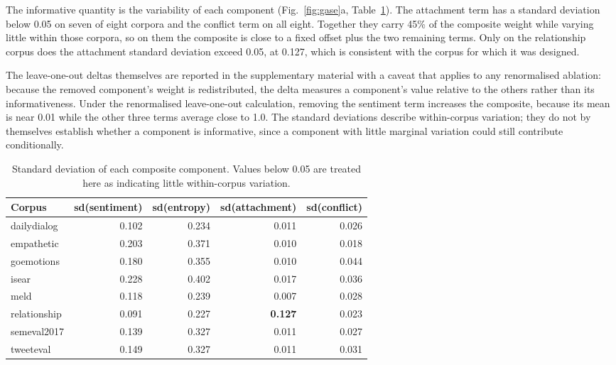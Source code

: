 \documentclass[fleqn,10pt]{wlscirep}
\providecommand{\botrule}{\bottomrule}
\begin{document}
The informative quantity is the variability of each component (Fig.~\ref{fig:gase}a, Table~\ref{tab:gase}). The attachment term has a standard deviation below 0.05 on seven of eight corpora and the conflict term on all eight. Together they carry 45\% of the composite weight while varying little within those corpora, so on them the composite is close to a fixed offset plus the two remaining terms. Only on the relationship corpus does the attachment standard deviation exceed 0.05, at 0.127, which is consistent with the corpus for which it was designed.

The leave-one-out deltas themselves are reported in the supplementary material with a caveat that applies to any renormalised ablation: because the removed component's weight is redistributed, the delta measures a component's value relative to the others rather than its informativeness. Under the renormalised leave-one-out calculation, removing the sentiment term increases the composite, because its mean is near 0.01 while the other three terms average close to 1.0. The standard deviations describe within-corpus variation; they do not by themselves establish whether a component is informative, since a component with little marginal variation could still contribute conditionally.

\begin{table}[ht]
\centering
\caption{Standard deviation of each composite component. Values below 0.05 are treated here as indicating little within-corpus variation.}
\label{tab:gase}
\begin{tabular}{lrrrr}
\toprule
Corpus & sd(sentiment) & sd(entropy) & sd(attachment) & sd(conflict) \\
\midrule
dailydialog  & 0.102 & 0.234 & 0.011 & 0.026 \\
empathetic   & 0.203 & 0.371 & 0.010 & 0.018 \\
goemotions   & 0.180 & 0.355 & 0.010 & 0.044 \\
isear        & 0.228 & 0.402 & 0.017 & 0.036 \\
meld         & 0.118 & 0.239 & 0.007 & 0.028 \\
relationship & 0.091 & 0.227 & \textbf{0.127} & 0.023 \\
semeval2017  & 0.139 & 0.327 & 0.011 & 0.027 \\
tweeteval    & 0.149 & 0.327 & 0.011 & 0.031 \\
\botrule
\end{tabular}
\end{table}
\end{document}
